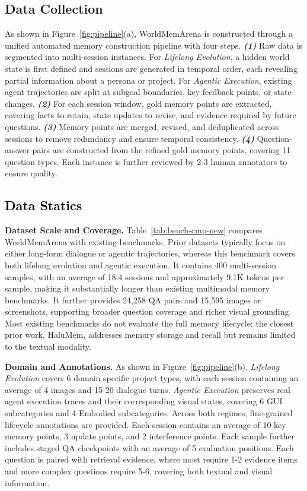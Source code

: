\documentclass{article}
\begin{document}
\subsection{Data Collection}
\vspace{-0.2cm}
As shown in Figure~\ref{fig:pipeline}(a), WorldMemArena is constructed through a unified automated memory construction pipeline with four steps.
\textit{{\textbf{(1)}}} Raw data is segmented into multi-session instances. For \textit{Lifelong Evolution}, a hidden world state is first defined and sessions are generated in temporal order, each revealing partial information about a persona or project. For \textit{Agentic Execution}, existing agent trajectories are split at subgoal boundaries, key feedback points, or state changes. \textit{\textbf{(2)}} For each session window, gold memory points are extracted, covering facts to retain, state updates to revise, and evidence required by future questions. \textit{\textbf{(3)}} Memory points are merged, revised, and deduplicated across sessions to remove redundancy and ensure temporal consistency.  \textit{\textbf{(4)}} Question-answer pairs are constructed from the refined gold memory points, covering 11 question types. Each instance is further reviewed by 2-3 human annotators to ensure quality.


\subsection{\textcolor{black}{Data Statics}}

\textbf{Dataset Scale and Coverage.} Table~\ref{tab:bench-cmp-new} compares WorldMemArena with existing benchmarks. Prior datasets typically focus on either long-form dialogue or agentic trajectories, whereas this benchmark covers both lifelong evolution and agentic execution. It contains 400 multi-session samples, with an average of 18.4 sessions and approximately 9.1K tokens per sample, making it substantially longer than existing multimodal memory benchmarks. It further provides 24{,}258 QA pairs and 15{,}595 images or screenshots, supporting broader question coverage and richer visual grounding. Most existing benchmarks do not evaluate the full memory lifecycle; the closest prior work, HaluMem, addresses memory storage and recall but remains limited to the textual modality.

\textbf{Domain and Annotations.} As shown in Figure~\ref{fig:pipeline}(b), \textit{Lifelong Evolution} covers 6 domain specific project types, with each session containing an average of 4 images and 15-20 dialogue turns. \textit{Agentic Execution} preserves real agent execution traces and their corresponding visual states, covering 6 GUI subcategories and 4 Embodied subcategories. Across both regimes, fine-grained lifecycle annotations are provided.
Each session contains an average of 10 key memory points, 3 update points,
and 2 interference points. Each sample further includes staged QA
checkpoints with an average of 5 evaluation positions. Each question is
paired with retrieval evidence, where most require 1-2 evidence items
and more complex questions require 5-6, covering both textual and visual information.
\end{document}
